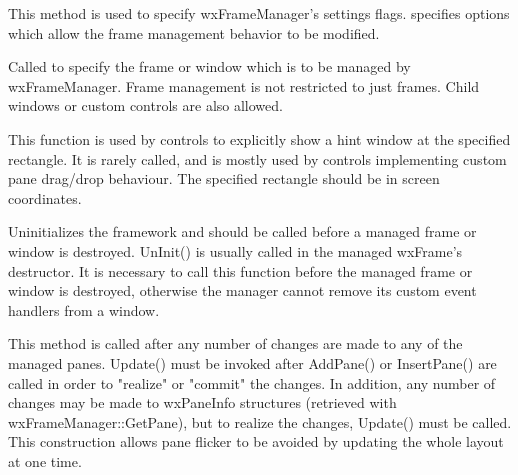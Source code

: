 \label{wxframemanagersetflags}


This method is used to specify wxFrameManager's settings flags. 
specifies options which allow the frame management behavior to be modified.

\label{wxframemanagersetmanagedwindow}


Called to specify the frame or window which is to be managed by wxFrameManager.  Frame management is not restricted to just frames.  Child windows or custom controls are also allowed.

\label{wxframemanagershowhint}


This function is used by controls to explicitly show a hint window at the specified rectangle.  It is rarely called, and is mostly used by controls implementing custom pane drag/drop behaviour.  The specified rectangle should be in screen coordinates.

\label{wxframemanageruninit}


Uninitializes the framework and should be called before a managed frame or window is destroyed. UnInit() is usually called in the managed wxFrame's destructor.  It is necessary to call this function before the managed frame or window is destroyed, otherwise the manager cannot remove its custom event handlers from a window.

\label{wxframemanagerupdate}


This method is called after any number of changes are
made to any of the managed panes. Update() must be invoked after
AddPane() or InsertPane() are called in order to "realize" or "commit"
the changes. In addition, any number of changes may be made to
wxPaneInfo structures (retrieved with wxFrameManager::GetPane), but to
realize the changes, Update() must be called. This construction allows
pane flicker to be avoided by updating the whole layout at one time.
